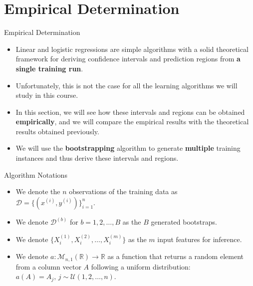 \section[Empirical Determination]{Empirical Determination}

\begin{frame}{Empirical Determination}
	\begin{itemize}
		\item Linear and logistic regressions are simple algorithms with a solid theoretical framework for deriving confidence intervals and prediction regions from \textbf{a single training run}.
		\pause
		\item Unfortunately, this is not the case for all the learning algorithms we will study in this course.
		\pause
		\item In this section, we will see how these intervals and regions can be obtained \textbf{empirically}, and we will compare the empirical results with the theoretical results obtained previously.
		\item We will use the \textbf{bootstrapping} algorithm to generate \textbf{multiple} training instances and thus derive these intervals and regions.
	\end{itemize}
\end{frame}

\begin{frame}{Algorithm Notations}
	\begin{itemize}
		\item We denote the $n$ observations of the training data as $\mathcal{D} = \{(x^{(i)}, y^{(i)})\}_{i=1}^n$.
		\item We denote $\mathcal{D}^{(b)}$ for $b=1, 2, \dots, B$ as the $B$ generated bootstraps.
		\item We denote $\{X_i^{(1)}, X_i^{(2)}, \dots, X_i^{(m)}\}$ as the $m$ input features for inference.
		\item We denote $a: \mathcal{M}_{n,1}(\mathbb{R}) \to \mathbb{R}$ as a function that returns a random element from a column vector $A$ following a uniform distribution: $a(A) = A_j, \, j \sim \mathcal{U}(1, 2, \dots, n)$.
	\end{itemize}
\end{frame}

